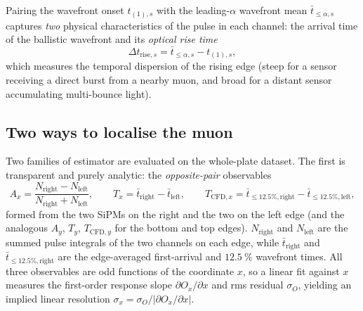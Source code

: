 \documentclass[11pt,a4paper]{article}
\begin{document}
Pairing the wavefront onset $t_{(1),s}$ with the leading-$\alpha$ wavefront
mean $\bar t_{\le\alpha,s}$ captures \emph{two} physical characteristics of the
pulse in each channel: the arrival time of the ballistic wavefront and its
\emph{optical rise time}
\begin{equation}
  \Delta t_{\mathrm{rise},s} = \bar t_{\le\alpha,s} - t_{(1),s},
  \label{eq:risetime}
\end{equation}
which measures the temporal dispersion of the rising edge (steep for a sensor
receiving a direct burst from a nearby muon, and broad for a distant sensor
accumulating multi-bounce light).

\subsection{Two ways to localise the muon}
\label{sec:recon-learned-method}

Two families of estimator are evaluated on the whole-plate dataset.  The first
is transparent and purely analytic: the \emph{opposite-pair} observables
\begin{equation}
  A_x = \frac{N_{\mathrm{right}}-N_{\mathrm{left}}}
             {N_{\mathrm{right}}+N_{\mathrm{left}}},
  \qquad
  T_x = \bar t_{\mathrm{right}}-\bar t_{\mathrm{left}},
  \qquad
  T_{\mathrm{CFD},x} = \bar t_{\le 12.5\%,\mathrm{right}}-\bar t_{\le 12.5\%,\mathrm{left}},
  \label{eq:pair}
\end{equation}
formed from the two SiPMs on the right and the two on the left edge (and the
analogous $A_y$, $T_y$, $T_{\mathrm{CFD},y}$ for the bottom and top edges).
$N_{\mathrm{right}}$ and $N_{\mathrm{left}}$ are the summed pulse integrals of
the two channels on each edge, while $\bar t_{\mathrm{right}}$ and
$\bar t_{\le 12.5\%,\mathrm{right}}$ are the edge-averaged first-arrival and
$\SI{12.5}{\percent}$ wavefront times.  All three observables are odd
functions of the coordinate $x$, so a linear fit against $x$ measures the
first-order response slope $\partial O_x / \partial x$ and rms residual
$\sigma_O$, yielding an implied linear resolution
$\sigma_x = \sigma_O / |\partial O_x / \partial x|$.
\end{document}
